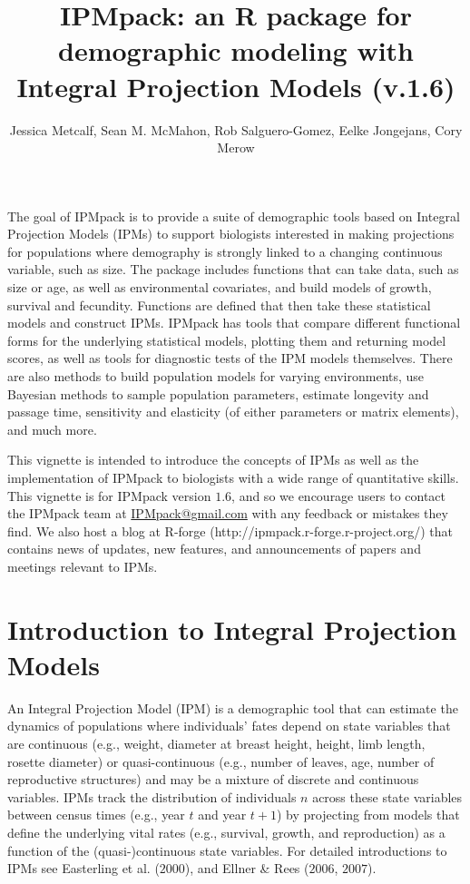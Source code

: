 \documentclass{article}
\begin{document}
\title{IPMpack: an R package for demographic modeling with Integral Projection
Models (v.1.6)}
\author{Jessica Metcalf, Sean M. McMahon, Rob Salguero-Gomez, Eelke Jongejans,
Cory Merow}
\maketitle


The goal of IPMpack is to provide a suite of demographic tools based
on Integral Projection Models (IPMs) to support biologists interested in
making projections for populations where demography is strongly linked to a changing continuous variable, such as size. The package includes functions that can take data, such as size or age, as well as environmental covariates, and build models of growth, survival and fecundity. Functions are defined that then take these
statistical models and construct IPMs. IPMpack has tools that compare different
functional forms for the underlying statistical models, plotting them and
returning model scores, as well as tools for diagnostic tests of the IPM models
themselves. There are also methods to build population models for varying environments, use Bayesian methods to sample population parameters,  estimate longevity and passage time, sensitivity and elasticity (of either parameters or matrix elements), and much more.

This vignette is intended to introduce the concepts of IPMs as well as the
implementation of IPMpack to biologists with a wide range of quantitative skills.  This vignette is for IPMpack version $1.6$, and so we encourage users to contact the IPMpack team at \href{IPMpack@gmail.com}{IPMpack@gmail.com} with any feedback or mistakes they find.  We also host a blog at R-forge (http://ipmpack.r-forge.r-project.org/) that contains news of updates, new features, and announcements of papers and meetings relevant to IPMs.
 
\newpage

\section{Introduction to Integral Projection Models}
An Integral Projection Model (IPM) is a demographic tool that can estimate the
dynamics of populations where individuals' fates depend on state variables that
are continuous (e.g., weight, diameter at breast height, height, limb length,
rosette diameter) or quasi-continuous (e.g., number of leaves, age, number of
reproductive structures) and may be a mixture of discrete and continuous
variables. IPMs track the distribution of individuals $n$ across these state
variables between census times (e.g., year $t$ and year $t+1$) by projecting from models that define the underlying vital rates (e.g., survival, growth, and reproduction) as a function of the (quasi-)continuous state variables. For detailed introductions to IPMs see Easterling et al. ($2000$), and Ellner \& Rees ($2006$, $2007$).
\end{document}

